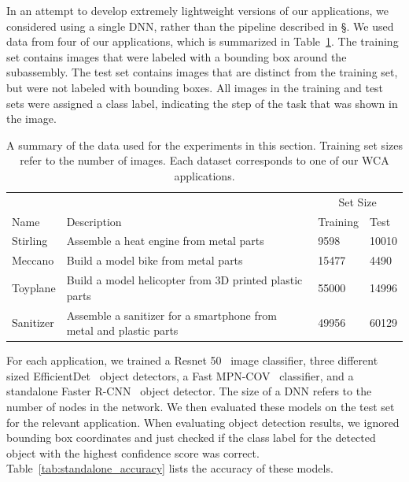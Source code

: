 In an attempt to develop extremely lightweight versions of our applications,
we considered using a single DNN, rather than the pipeline described in
\S\label{sec:two_stage}.
We used data from four of our applications, which is summarized in
Table~\ref{tab:dataset_size}.
The training set contains images that were labeled with a bounding box around
the subassembly.
The test set contains images that are distinct from the training set, but were
not labeled with bounding boxes.
All images in the training and test sets were assigned a class label, indicating
the step of the task that was shown in the image.

\begin{table}
\begin{tabular}{|l||p{11cm}|l|l|}
  \hline
  & & \multicolumn{2}{c|}{Set Size}\\
  Name & Description & Training & Test \\
  \hline
  \hline
  Stirling & Assemble a heat engine from metal parts & 9598 & 10010\\
  Meccano & Build a model bike from metal parts & 15477 & 4490\\
  Toyplane & Build a model helicopter from 3D printed plastic parts & 55000 & 14996\\
  Sanitizer & Assemble a sanitizer for a smartphone from metal and plastic parts & 49956 & 60129\\
  \hline
\end{tabular}
  \caption{
    A summary of the data used for the experiments in this section.
    Training set sizes refer to the number of images.
    Each dataset corresponds to one of our WCA applications.
  }\label{tab:dataset_size}
\end{table}

For each application, we trained a Resnet 50~\cite{He2016} image classifier,
three different sized EfficientDet~\cite{Tan2020} object detectors, a
Fast MPN-COV~\cite{Li_2018_CVPR} classifier, and a standalone Faster
R-CNN~\cite{frcnn} object detector.
The size of a DNN refers to the number of nodes in the network.
We then evaluated these models on the test set for the relevant application.
When evaluating object detection results, we ignored bounding box coordinates
and just checked if the class label for the detected object with the highest
confidence score was correct.
Table~\ref{tab:standalone_accuracy} lists the accuracy of these models.

